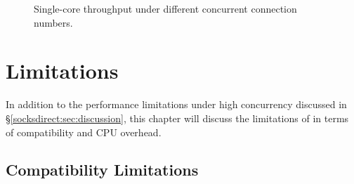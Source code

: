 \begin{figure}[htbp]
	\centering
	
	\caption{Single-core throughput under different concurrent connection numbers.}
	\label{socksdirect:fig:eval-connnum-tput}
\end{figure}


\section{Limitations}
\label{sockdirect:sec:limitation}

In addition to the performance limitations under high concurrency discussed in \S\ref{socksdirect:sec:discussion}, this chapter will discuss the limitations of \sys{} in terms of compatibility and CPU overhead.

\subsection{Compatibility Limitations}



